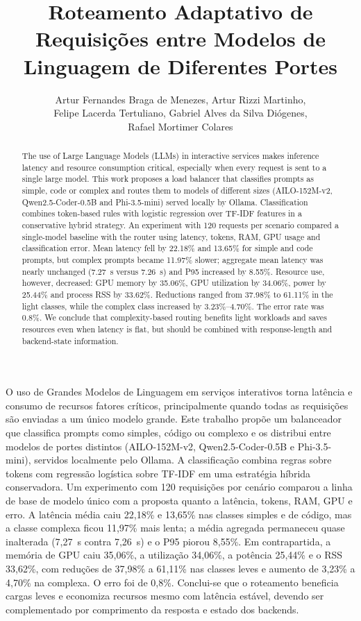 \documentclass[12pt]{article}
\title{Roteamento Adaptativo de Requisições entre Modelos de Linguagem de Diferentes Portes}
\author{Artur Fernandes Braga de Menezes\inst{1}, Artur Rizzi Martinho\inst{1},\\ Felipe Lacerda Tertuliano\inst{1}, Gabriel Alves da Silva Diógenes\inst{1},\\ Rafael Mortimer Colares\inst{1}}
\begin{document}
\maketitle

\begin{abstract}
The use of Large Language Models (LLMs) in interactive services makes inference latency and resource consumption critical, especially when every request is sent to a single large model. This work proposes a load balancer that classifies prompts as simple, code or complex and routes them to models of different sizes (AILO-152M-v2, Qwen2.5-Coder-0.5B and Phi-3.5-mini) served locally by Ollama. Classification combines token-based rules with logistic regression over TF-IDF features in a conservative hybrid strategy. An experiment with 120 requests per scenario compared a single-model baseline with the router using latency, tokens, RAM, GPU usage and classification error. Mean latency fell by 22.18\% and 13.65\% for simple and code prompts, but complex prompts became 11.97\% slower; aggregate mean latency was nearly unchanged (7.27~s versus 7.26~s) and P95 increased by 8.55\%. Resource use, however, decreased: GPU memory by 35.06\%, GPU utilization by 34.06\%, power by 25.44\% and process RSS by 33.62\%. Reductions ranged from 37.98\% to 61.11\% in the light classes, while the complex class increased by 3.23\%--4.70\%. The error rate was 0.8\%. We conclude that complexity-based routing benefits light workloads and saves resources even when latency is flat, but should be combined with response-length and backend-state information.
\end{abstract}

\begin{resumo}
O uso de Grandes Modelos de Linguagem em serviços interativos torna latência e consumo de recursos fatores críticos, principalmente quando todas as requisições são enviadas a um único modelo grande. Este trabalho propõe um balanceador que classifica prompts como simples, código ou complexo e os distribui entre modelos de portes distintos (AILO-152M-v2, Qwen2.5-Coder-0.5B e Phi-3.5-mini), servidos localmente pelo Ollama. A classificação combina regras sobre tokens com regressão logística sobre TF-IDF em uma estratégia híbrida conservadora. Um experimento com 120 requisições por cenário comparou a linha de base de modelo único com a proposta quanto a latência, tokens, RAM, GPU e erro. A latência média caiu 22,18\% e 13,65\% nas classes simples e de código, mas a classe complexa ficou 11,97\% mais lenta; a média agregada permaneceu quase inalterada (7,27~s contra 7,26~s) e o P95 piorou 8,55\%. Em contrapartida, a memória de GPU caiu 35,06\%, a utilização 34,06\%, a potência 25,44\% e o RSS 33,62\%, com reduções de 37,98\% a 61,11\% nas classes leves e aumento de 3,23\% a 4,70\% na complexa. O erro foi de 0,8\%. Conclui-se que o roteamento beneficia cargas leves e economiza recursos mesmo com latência estável, devendo ser complementado por comprimento da resposta e estado dos backends.
\end{resumo}
\end{document}
